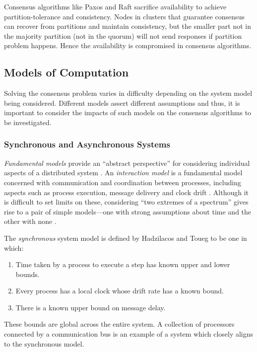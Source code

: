 \documentclass[12pt, a4paper]{article}
\begin{document}
Consensus algorithms like Paxos and Raft sacrifice availability to achieve partition-tolerance and consistency. Nodes in clusters that guarantee consensus can recover from partitions and maintain consistency, but the smaller part not in the majority partition (not in the quorum) will not send responses if partition problem happens. Hence the availability is compromised in consensus algorithms.

\subsection{Models of Computation} \label{sec:fundamental-models}

Solving the consensus problem varies in difficulty depending on the system model
being considered. Different models assert different assumptions and thus, it is
important to consider the impacts of such models on the consensus algorithms to
be investigated.

\subsubsection{Synchronous and Asynchronous Systems}

\textit{Fundamental models} provide an ``abstract perspective'' for considering
individual aspects of a distributed system \cite{coulouris2005distributed}. An
\textit{interaction model} is a fundamental model concerned with communication
and coordination between processes, including aspects such as process execution,
message delivery and clock drift \cite{coulouris2005distributed}. Although it is
difficult to set limits on these, considering ``two extremes of a spectrum''
gives rise to a pair of simple models---one with strong assumptions about time
and the other with none \cite{coulouris2005distributed, hadzilacos1994modular}.

The \textit{synchronous} system model is defined by Hadzilacos and Toueg
\cite{hadzilacos1994modular} to be one in which:

\begin{enumerate}
  \item Time taken by a process to execute a step has known upper and lower
    bounds.
  \item Every process has a local clock whose drift rate has a known bound.
  \item There is a known upper bound on message delay.
\end{enumerate}

These bounds are global across the entire system. A collection of processors
connected by a communication bus is an example of a system which closely aligns
to the synchronous model.
\end{document}
